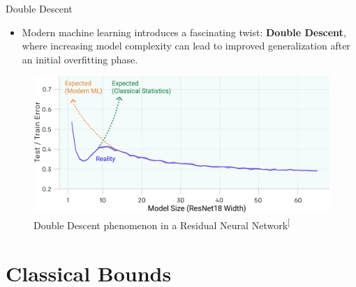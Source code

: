 \documentclass[
  ignorenonframetext,
]{beamer}
\providecommand{\tightlist}{%
  \setlength{\itemsep}{0pt}\setlength{\parskip}{0pt}}\usepackage{longtable,booktabs,array}
\begin{document}
\begin{frame}{Double Descent}
\label{double-descent}
\begin{itemize}
\tightlist
\item
  Modern machine learning introduces a fascinating twist: \textbf{Double
  Descent}, where increasing model complexity can lead to improved
  generalization after an initial overfitting phase.
\end{itemize}

\begin{figure}[H]

{\centering \includegraphics[width=0.86\linewidth,height=\textheight,keepaspectratio]{extra/double_descent.png}

}

\caption{Double Descent phenomenon in a Residual Neural
Network\textsuperscript{{[}\citeproc{ref-nakkiran19}{2}{]}}}

\end{figure}%
\end{frame}

\section{Classical Bounds}\label{classical-bounds}
\end{document}
